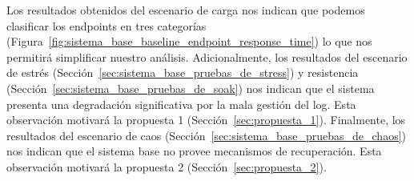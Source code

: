     Los resultados obtenidos del escenario de carga nos indican que podemos clasificar los endpoints en tres categorías (Figura~\ref{fig:sistema_base_baseline_endpoint_response_time}) lo que nos permitirá simplificar nuestro análisis.
    Adicionalmente, los resultados del escenario de estrés (Sección~\ref{sec:sistema_base_pruebas_de_stress}) y resistencia (Sección~\ref{sec:sistema_base_pruebas_de_soak}) nos indican que el sistema presenta una degradación significativa por la mala gestión del log. Esta observación motivará la propuesta 1 (Sección~\ref{sec:propuesta_1}).
    Finalmente, los resultados del escenario de caos (Sección~\ref{sec:sistema_base_pruebas_de_chaos}) nos indican que el sistema base no provee mecanismos de recuperación. Esta observación motivará la propuesta 2 (Sección~\ref{sec:propuesta_2}).